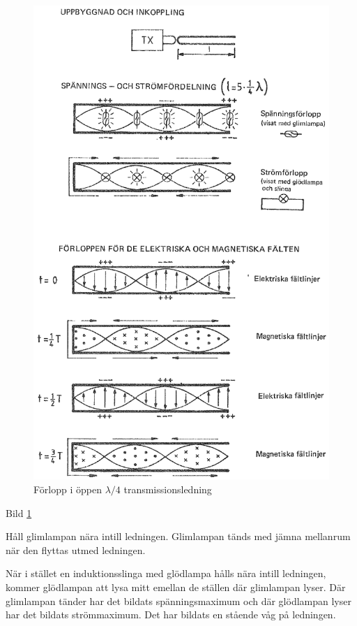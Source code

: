 \begin{figure}
  \includegraphics[width=\textwidth]{images/cropped_pdfs/bild_2_6-33.pdf}
  \caption{Förlopp i öppen $\lambda/4$ transmissionsledning}
  \label{fig:bildII6-33}
\end{figure}

Bild \ref{fig:bildII6-33}

Håll glimlampan nära intill ledningen. Glimlampan tänds med jämna
mellanrum när den flyttas utmed ledningen.

När i stället en induktionsslinga med glödlampa hålls nära intill
ledningen, kommer glödlampan att lysa mitt emellan de ställen där
glimlampan lyser. Där glimlampan tänder har det bildats
spänningsmaximum och där glödlampan lyser har det bildats
strömmaximum. Det har bildats en stående våg på ledningen.

